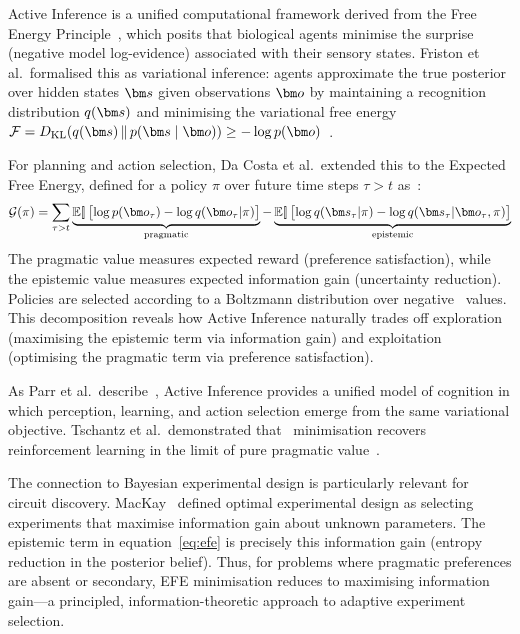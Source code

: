 Active Inference is a unified computational framework derived from the Free Energy
Principle~\cite{Friston2010}, which posits that biological agents minimise the
surprise (negative model log-evidence) associated with their sensory states. Friston
et al.\ formalised this as variational inference: agents approximate the true posterior
over hidden states $\vect{s}$ given observations $\vect{o}$ by maintaining a
recognition distribution $q(\vect{s})$ and minimising the variational free energy
$\FE = \KL{q(\vect{s})}{p(\vect{s}\mid\vect{o})} \geq
-\log p(\vect{o})$~\cite{Friston2017}.

For planning and action selection, Da Costa et al.\ extended this to the Expected Free
Energy, defined for a policy $\pi$ over future time steps $\tau > t$
as~\cite{DaCosta2020}:
\begin{equation}
  \label{eq:efe}
  \EFE(\pi) = \sum_{\tau > t}
    \underbrace{\E\!\bigl[\log p(\vect{o}_\tau) - \log q(\vect{o}_\tau|\pi)\bigr]}_{\text{pragmatic}}
    - \underbrace{\E\!\bigl[\log q(\vect{s}_\tau|\pi) - \log q(\vect{s}_\tau|\vect{o}_\tau,\pi)\bigr]}_{\text{epistemic}}
\end{equation}
The pragmatic value measures expected reward (preference satisfaction), while the
epistemic value measures expected information gain (uncertainty reduction). Policies are
selected according to a Boltzmann distribution over negative \EFE\ values. This
decomposition reveals how Active Inference naturally trades off exploration
(maximising the epistemic term via information gain) and exploitation (optimising the
pragmatic term via preference satisfaction).

As Parr et al.\ describe~\cite{Parr2022}, Active Inference provides a unified model
of cognition in which perception, learning, and action selection emerge from the same
variational objective. Tschantz et al.\ demonstrated that \EFE\ minimisation recovers
reinforcement learning in the limit of pure pragmatic value~\cite{Tschantz2020}.

The connection to Bayesian experimental design is particularly relevant for circuit
discovery. MacKay~\cite{MacKay2003} defined optimal experimental design as selecting
experiments that maximise information gain about unknown parameters. The epistemic term
in equation~\ref{eq:efe} is precisely this information gain (entropy reduction in the
posterior belief). Thus, for problems where pragmatic preferences are absent or
secondary, EFE minimisation reduces to maximising information gain—a principled,
information-theoretic approach to adaptive experiment selection.

